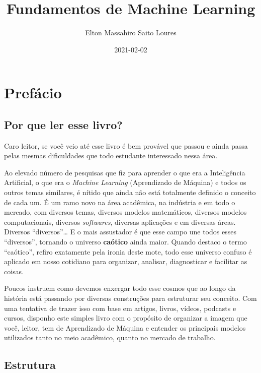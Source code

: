 \documentclass[
  openany]{book}
\title{Fundamentos de Machine Learning}
\author{Elton Massahiro Saito Loures}
\date{2021-02-02}
\begin{document}
\maketitle

{
\setcounter{tocdepth}{1}
\tableofcontents
}
\hypertarget{prefuxe1cio}{%
\chapter*{Prefácio}\label{prefuxe1cio}}

\hypertarget{por-que-ler-esse-livro}{%
\section{Por que ler esse livro?}\label{por-que-ler-esse-livro}}

Caro leitor, se você veio até esse livro é bem provável que passou e ainda passa pelas mesmas dificuldades que todo estudante interessado nessa área.

Ao elevado número de pesquisas que fiz para aprender o que era a Inteligência Artificial, o que era o \emph{Machine Learning} (Aprendizado de Máquina) e todos os outros temas similares, é nítido que ainda não está totalmente definido o conceito de cada um. É um ramo novo na área acadêmica, na indústria e em todo o mercado, com diversos temas, diversos modelos matemáticos, diversos modelos computacionais, diversos \emph{softwares}, diversas aplicações e em diversas áreas. Diversos ``diversos''\ldots{} E o mais assustador é que esse campo une todos esses ``diversos'', tornando o universo \textbf{caótico} ainda maior. Quando destaco o termo ``caótico'', refiro exatamente pela ironia deste mote, todo esse universo confuso é aplicado em nosso cotidiano para organizar, analisar, diagnosticar e facilitar as coisas.

Poucos instruem como devemos enxergar todo esse cosmos que ao longo da história está passando por diversas construções para estruturar seu conceito. Com uma tentativa de trazer isso com base em artigos, livros, vídeos, podcasts e cursos, disponho este simples livro com o propósito de organizar a imagem que você, leitor, tem de Aprendizado de Máquina e entender os principais modelos utilizados tanto no meio acadêmico, quanto no mercado de trabalho.

\hypertarget{estrutura}{%
\section{Estrutura}\label{estrutura}}
\end{document}
